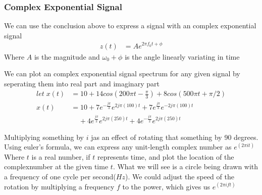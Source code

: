 \documentclass{article}
\newlength\tindent
\renewcommand{\indent}{\hspace*{\tindent}}
\begin{document}
    \subsubsection{Complex Exponential Signal}

    We can use the conclusion above to express a signal with an complex exponential signal
    \begin{align}
        z(t) &= Ae^{2 \pi f_0 t + \phi}
    \end{align}
    Where $A$ is the magnitude and $\omega_0 + \phi$ is the angle linearly variating in time 

    We can plot an complex exponential signal spectrum for any given signal by seperating them into real part and imaginary part
    \begin{align}
        let\; x(t) &= 10 + 14 cos(200 \pi t - \frac{\pi}{3}) + 8 cos(500 \pi t + \pi/2)\\
        x(t) &= 10 + 7e^{-\frac{j\pi}{3}} e^{2j\pi(100)t} + 7e^{\frac{j\pi}{3}} e^{-2j\pi(100)t}\\
        &\;\;\;\; + 4e^{\frac{j\pi}{2}} e^{2j\pi(250)t} + 4e^{-\frac{j\pi}{2}} e^{2j\pi(250)t} \nonumber
    \end{align}

    \begin{center}
    \end{center}

    Multiplying something by $i$ jas an effect of rotating that something by 90 degrees. 
    Using euler's formula, we can express any unit-length complex number as $e ^ {(2 \pi i t)}$
    Where $t$ is a real number, if $t$ represents time, 
    and plot the location of the complexnumber at the given time $t$.
    What we will see is a circle being drawn with a frequency of one cycle per second($Hz$).
    We could adjust the speed of the rotation by multiplying a frequency $f$ to the power, 
    which gives us $e ^ {(2 \pi i f t)}$\\\indent
\end{document}

